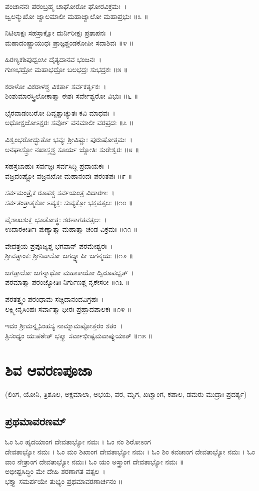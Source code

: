 ಪಂಚಾನನಃ ಪರಂಬ್ರಹ್ಮ ಚಾಘೋರೋ ಘೋರವಿಕ್ರಮಃ~।\\
ಜ್ವಲನ್ಮುಖೋ ಜ್ವಾಲಮಾಲೀ ಮಹಾಜ್ವಾಲೋ ಮಹಾಪ್ರಭುಃ ॥೩ ॥

ನಿಟಿಲಾಕ್ಷಃ ಸಹಸ್ರಾಕ್ಷೋ ದುರ್ನಿರೀಕ್ಷಃ ಪ್ರತಾಪನಃ~।\\
ಮಹಾದಂಷ್ಟ್ರಾಯುಧಃ ಪ್ರಾಜ್ಞಶ್ಚಂಡಕೋಪೀ ಸದಾಶಿವಃ ॥೪ ॥

ಹಿರಣ್ಯಕಶಿಪುಧ್ವಂಸೀ ದೈತ್ಯದಾನವ ಭಂಜನಃ~।\\
ಗುಣಭದ್ರೋ ಮಹಾಭದ್ರೋ ಬಲಭದ್ರಃ ಸುಭದ್ರಕಃ ॥೫ ॥

ಕರಾಳೋ ವಿಕರಾಳಶ್ಚ ವಿಕರ್ತಾ ಸರ್ವಕರ್ತೃಕಃ~।\\
ಶಿಂಶುಮಾರಸ್ತ್ರಿಲೋಕಾತ್ಮಾ ಈಶಃ ಸರ್ವೇಶ್ವರೋ ವಿಭುಃ ॥೬ ॥

ಭೈರವಾಡಂಬರೋ ದಿವ್ಯಶ್ಚಾಚ್ಯುತಃ ಕವಿ ಮಾಧವಃ~।\\
ಅಧೋಕ್ಷಜೋಽಕ್ಷರಃ ಸರ್ವೋ ವನಮಾಲೀ ವರಪ್ರದಃ ॥೭ ॥

ವಿಶ್ವಂಭರೋದ್ಭುತೋ ಭವ್ಯಃ ಶ್ರೀವಿಷ್ಣುಃ ಪುರುಷೋತ್ತಮಃ~।\\
ಅನಘಾಸ್ತ್ರೋ ನಖಾಸ್ತ್ರಶ್ಚ ಸೂರ್ಯ ಜ್ಯೋತಿಃ ಸುರೇಶ್ವರಃ ॥೮ ॥

ಸಹಸ್ರಬಾಹುಃ ಸರ್ವಜ್ಞಃ ಸರ್ವಸಿದ್ಧಿ ಪ್ರದಾಯಕಃ~।\\
ವಜ್ರದಂಷ್ಟ್ರೋ ವಜ್ರನಖೋ ಮಹಾನಂದಃ ಪರಂತಪಃ ॥೯ ॥

ಸರ್ವಮಂತ್ರೈಕ ರೂಪಶ್ಚ ಸರ್ವಯಂತ್ರ ವಿದಾರಣಃ~।\\
ಸರ್ವತಂತ್ರಾತ್ಮಕೋ ಽವ್ಯಕ್ತಃ ಸುವ್ಯಕ್ತೋ ಭಕ್ತವತ್ಸಲಃ ॥೧೦ ॥

ವೈಶಾಖಶುಕ್ಲ ಭೂತೋತ್ಥಃ ಶರಣಾಗತವತ್ಸಲಃ~।\\
ಉದಾರಕೀರ್ತಿಃ ಪುಣ್ಯಾತ್ಮಾ ಮಹಾತ್ಮಾ ಚಂಡ ವಿಕ್ರಮಃ ॥೧೧ ॥

ವೇದತ್ರಯ ಪ್ರಪೂಜ್ಯಶ್ಚ ಭಗವಾನ್ ಪರಮೇಶ್ವರಃ~।\\
ಶ್ರೀವತ್ಸಾಂಕಃ ಶ್ರೀನಿವಾಸೋ ಜಗದ್ವ್ಯಾಪೀ ಜಗನ್ಮಯಃ ॥೧೨ ॥

ಜಗತ್ಪಾಲೋ ಜಗನ್ನಾಥೋ ಮಹಾಕಾಯೋ ದ್ವಿರೂಪಭೃತ್~।\\
ಪರಮಾತ್ಮಾ ಪರಂಜ್ಯೋತಿಃ ನಿರ್ಗುಣಶ್ಚ ನೃಕೇಸರೀ ॥೧೩ ॥

ಪರತತ್ತ್ವಂ ಪರಂಧಾಮ ಸಚ್ಚಿದಾನಂದವಿಗ್ರಹಃ~।\\
ಲಕ್ಷ್ಮೀನೃಸಿಂಹಃ ಸರ್ವಾತ್ಮಾ ಧೀರಃ ಪ್ರಹ್ಲಾದಪಾಲಕಃ ॥೧೪ ॥

ಇದಂ ಶ್ರೀಮನ್ನೃಸಿಂಹಸ್ಯ ನಾಮ್ನಾಮಷ್ಟೋತ್ತರಂ ಶತಂ~।\\
ತ್ರಿಸಂಧ್ಯಂ ಯಃಪಠೇತ್ ಭಕ್ತ್ಯಾ ಸರ್ವಾಭೀಷ್ಟಮವಾಪ್ನುಯಾತ್ ॥೧೫ ॥

\section{ಶಿವ ಆವರಣಪೂಜಾ}
(ಲಿಂಗ, ಯೋನಿ, ತ್ರಿಶೂಲ, ಅಕ್ಷಮಾಲಾ, ಅಭಯ, ವರ, ಮೃಗ, ಖಟ್ವಾಂಗ, ಕಪಾಲ, ಡಮರು ಮುದ್ರಾಃ ಪ್ರದರ್ಶ್ಯ)
\subsection{ಪ್ರಥಮಾವರಣಮ್}
ಓಂ ಓಂ ಹೃದಯಾಂಗ ದೇವತಾಭ್ಯೋ ನಮಃ । ಓಂ ನಂ ಶಿರೋಽಂಗ \\ದೇವತಾಭ್ಯೋ ನಮಃ । ಓಂ ಮಂ ಶಿಖಾಂಗ ದೇವತಾಭ್ಯೋ ನಮಃ । ಓಂ ಶಿಂ ಕವಚಾಂಗ ದೇವತಾಭ್ಯೋ ನಮಃ । ಓಂ ವಾಂ ನೇತ್ರಾಂಗ ದೇವತಾಭ್ಯೋ ನಮಃ। ಓಂ ಯಂ ಅಸ್ತ್ರಾಂಗ ದೇವತಾಭ್ಯೋ ನಮಃ ॥\\
ಅಭೀಷ್ಟಸಿದ್ಧಿಂ ಮೇ ದೇಹಿ ಶರಣಾಗತ ವತ್ಸಲ~।\\
ಭಕ್ತ್ಯಾ ಸಮರ್ಪಯೇ ತುಭ್ಯಂ ಪ್ರಥಮಾವರಣಾರ್ಚನಂ ॥
